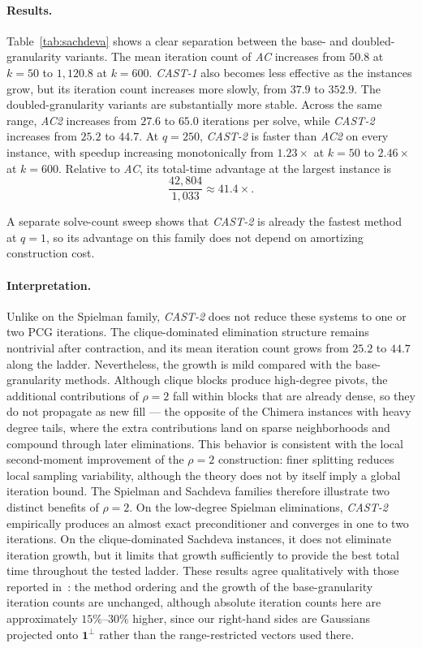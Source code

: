\documentclass{article}
\newcommand{\CASTone}{\textit{CAST-1}\xspace}
\newcommand{\CASTtwo}{\textit{CAST-2}\xspace}
\newcommand{\AC}{\textit{AC}\xspace}
\newcommand{\ACtwo}{\textit{AC2}\xspace}
\newcommand{\1}{\mathbbm{1}}
\theoremstyle{plain}
\begin{document}
\paragraph{Results.}
Table~\ref{tab:sachdeva} shows a clear separation between the base- and doubled-granularity variants. The mean iteration count of \AC increases from $50.8$ at $k=50$ to $1{,}120.8$ at $k=600$. \CASTone also becomes less effective as the instances grow, but its iteration count increases more slowly, from $37.9$ to $352.9$.
The doubled-granularity variants are substantially more stable. Across the same range, \ACtwo increases from $27.6$ to $65.0$ iterations per solve, while \CASTtwo increases from $25.2$ to $44.7$. At $q=250$, \CASTtwo is faster than \ACtwo on every instance, with speedup increasing monotonically from $1.23\times$ at $k=50$ to $2.46\times$ at $k=600$. Relative to \AC, its total-time advantage at the largest instance is
\[
\frac{42{,}804}{1{,}033} \approx 41.4\times.
\]

A separate solve-count sweep shows that \CASTtwo{} is already the
fastest method at $q=1$, so its advantage on this family does not
depend on amortizing construction cost.

\paragraph{Interpretation.}
Unlike on the Spielman family, \CASTtwo does not reduce these systems to one or two PCG iterations. The clique-dominated elimination structure remains nontrivial after contraction, and its mean iteration count grows from $25.2$ to $44.7$ along the ladder. Nevertheless, the growth is mild compared with the base-granularity methods. Although clique blocks produce high-degree pivots, the additional
contributions of $\rho=2$ fall within blocks that are already dense,
so they do not propagate as new fill --- the opposite of the Chimera
instances with heavy degree tails, where the extra contributions land
on sparse neighborhoods and compound through later eliminations. This behavior is consistent with the local second-moment improvement of the $\rho=2$ construction: finer splitting reduces local sampling variability, although the theory does not by itself imply a global iteration bound.
The Spielman and Sachdeva families therefore illustrate two distinct benefits of $\rho=2$. On the low-degree Spielman eliminations, \CASTtwo empirically produces an almost exact pre\-conditioner and converges in one to two iterations. On the clique-dominated Sachdeva instances, it does not eliminate iteration growth, but it limits that growth sufficiently to provide the best total time throughout the tested ladder. These results agree qualitatively with those reported in~\cite{AC}:
the method ordering and the growth of the base-granularity iteration
counts are unchanged, although absolute iteration counts here are
approximately $15\%$--$30\%$ higher, since our right-hand sides are
Gaussians projected onto $\mathbf 1^\perp$ rather than the range-restricted vectors used there.
\end{document}
